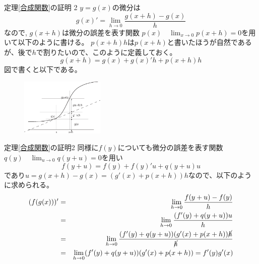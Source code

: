 %
%
\begin{slide}{定理\ref{合成関数}の証明 2}
$y=g(x)$の微分は
\begin{equation}
g(x)'= \lim_{h\to 0} \frac{g(x+h) - g(x)}{h} \nonumber
\end{equation}
なので, $g(x+h)$は微分の誤差を表す関数
$p(x) \quad \lim_{x\to 0} p(x+h) = 0$を用いて以下のように書ける。
$p(x+h)h$は$p(x+h)$と書いたほうが自然であるが、後で$h$で割りたいので、このように定義しておく。
\begin{equation}
g(x+h) = g(x) + g(x)'h + p(x+h)h\nonumber
\end{equation}
図で書くと以下である。
\begin{figure}[h]
\includegraphics[width=4cm]{calculus5/gosei.eps}
\end{figure}
\end{slide}
\begin{slide}{定理\ref{合成関数}の証明2}
同様に$f(y)$についても微分の誤差を表す関数$q(y) \quad \lim_{u\to 0} q(y+u) = 0$を用い
\begin{equation}
f(y+u) = f(y) + f(y)'u+q(y+u)u \nonumber 
\end{equation}
であり$u = g(x+h) - g(x) = (g'(x) + p(x+h)) h$なので、以下のように求められる。
\begin{eqnarray}
(f(g(x)))' &=& \lim_{h\to 0} \frac{f(y+u) - f(y)}{h}  \nonumber \\
&=& \lim_{h\to 0} \frac{(f'(y) + q(y+u)) u}{h} \nonumber \\
&=& \lim_{h\to 0} \frac{(f'(y) + q(y+u))(g'(x) + p(x+h))\cancel{h}}{\cancel{h}} \nonumber \\
&=& \lim_{h\to 0}(f'(y) + q(y+u))(g'(x) + p(x+h)) = f'(y) g'(x) \nonumber 
\end{eqnarray}
\end{slide}


